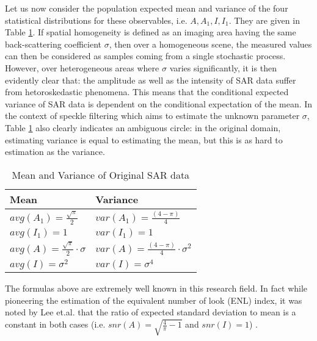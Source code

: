 Let us now consider the population expected mean and variance of the four statistical distributions for these observables, i.e. $A, A_1, I, I_1$.
They are given in Table \ref{tbl:orginal_sar_avg_var}. 
If spatial homogeneity is defined as an imaging area having the same back-scattering coefficient $\sigma$,
  then over a homogeneous scene, the measured values can then be considered as samples coming from a single stochastic process.
However, over heterogeneous areas where $\sigma$ varies significantly,
  it is then evidently clear that: the amplitude  as well as the intensity of SAR data suffer from hetoroskedastic phenomena. 
This means that  the conditional expected variance of SAR data is dependent on the conditional expectation of the mean.   
In the context of speckle filtering which aims to estimate the unknown parameter $\sigma$,
  Table \ref{tbl:orginal_sar_avg_var} also clearly indicates an ambiguous circle:
in the original domain, estimating variance is equal to estimating the mean, but this is as hard to estimation as the variance.

\begin{table}[!h]
\normalsize
\centering
\begin{tabular}{|l|l|}
\hline
Mean & Variance \\
\hline
$avg(A_1) = \frac{ \sqrt{\pi}}{2}$ & $var(A_1) = \frac{(4-\pi)}{4}$ \\
$avg(I_1) = 1$ & $var(I_1) = 1$ \\
$avg(A) = \frac{\sqrt{\pi}}{2} \cdot \sigma $ & $var(A) = \frac{(4-\pi)}{4} \cdot \sigma^2 $ \\
$avg(I) = \sigma^2 $ & $ var(I) = \sigma^4$ \\
\hline 
\end{tabular}
\caption{ Mean and Variance of Original SAR data }
\label{tbl:orginal_sar_avg_var}
\end{table}

The formulas above are extremely well known in this research field. 
In fact while pioneering the estimation of the equivalent number of look (ENL) index, 
 it was noted by Lee et.al. that the ratio of expected standard deviation to mean is a constant in both cases (i.e. $snr(A)=\sqrt{\frac{4}{\pi}-1}$ and $snr(I)=1$) \cite{Lee_1992_IMA_298}.

